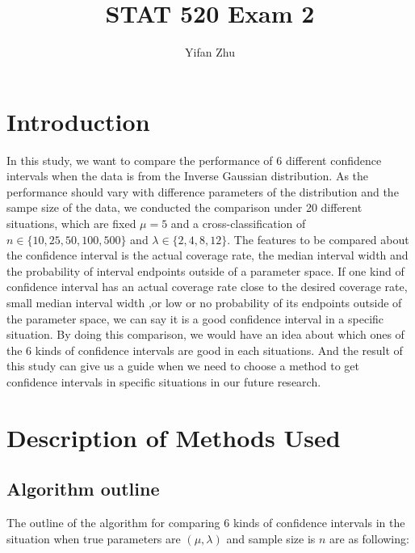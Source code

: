 \documentclass{article}
\begin{document}
	

	
	\title{STAT 520 Exam 2}
	\author{Yifan Zhu}
	\maketitle
	\section{Introduction} %
	\label{sec:introduction}
	In this study, we want to compare the performance of 6 different confidence intervals when the data is from the Inverse Gaussian distribution. As the performance should vary with difference parameters of the distribution and the sampe size of the data, we conducted the comparison under 20 different situations, which are fixed $\mu = 5$ and a cross-classification of $n \in \{10, 25, 50, 100, 500\}$ and $\lambda \in \{2, 4, 8, 12\}$. The features to be compared about the confidence interval is the actual coverage rate, the median interval width and the probability of interval endpoints outside of a parameter space. If one kind of confidence interval has an actual coverage rate close to the desired coverage rate, small median interval width ,or low or no probability of its endpoints outside of the parameter space, we can say it is a good confidence interval in a specific situation. By doing this comparison, we would have an idea about which ones of the 6 kinds of confidence intervals are good in each situations. And the result of this study can give us a guide when we need to choose a method to get confidence intervals in specific situations in our future research.  
	

	\section{Description of Methods Used}
	\subsection{Algorithm outline}\label{outline}
    The outline of the algorithm for comparing 6 kinds of confidence intervals in the situation when true parameters are $(\mu, \lambda)$ and sample size is $n$ are as following:
\end{document}
